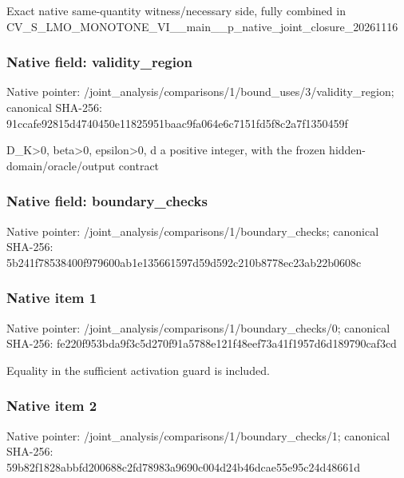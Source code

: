\documentclass[10pt,a4paper]{article}
\begin{document}
\begingroup\raggedright\sloppy Exact native same-quantity witness/\allowbreak{}necessary side,\allowbreak{} fully combined in CV\_\allowbreak{}S\_\allowbreak{}LMO\_\allowbreak{}MONOTONE\_\allowbreak{}VI\_\allowbreak{}\_\allowbreak{}main\_\allowbreak{}\_\allowbreak{}p\_\allowbreak{}native\_\allowbreak{}joint\_\allowbreak{}closure\_\allowbreak{}20261116\par\endgroup

\subsubsection{Native field: validity\_\allowbreak{}region}
Native pointer: /joint\_\allowbreak{}analysis/comparisons/1/bound\_\allowbreak{}uses/3/validity\_\allowbreak{}region; canonical SHA-256: 91ccafe92815d4740450e11825951baac9fa064e6c7151fd5f8c2a7f1350459f

\begingroup\raggedright\sloppy D\_\allowbreak{}K>0,\allowbreak{} beta>0,\allowbreak{} epsilon>0,\allowbreak{} d a positive integer,\allowbreak{} with the frozen hidden-domain/\allowbreak{}oracle/\allowbreak{}output contract\par\endgroup

\subsubsection{Native field: boundary\_\allowbreak{}checks}
Native pointer: /joint\_\allowbreak{}analysis/comparisons/1/boundary\_\allowbreak{}checks; canonical SHA-256: 5b241f78538400f979600ab1e135661597d59d592c210b8778ec23ab22b0608c

\subsubsection{Native item 1}
Native pointer: /joint\_\allowbreak{}analysis/comparisons/1/boundary\_\allowbreak{}checks/0; canonical SHA-256: fe220f953bda9f3c5d270f91a5788e121f48eef73a41f1957d6d189790caf3cd

\begingroup\raggedright\sloppy Equality in the sufficient activation guard is included.\par\endgroup

\subsubsection{Native item 2}
Native pointer: /joint\_\allowbreak{}analysis/comparisons/1/boundary\_\allowbreak{}checks/1; canonical SHA-256: 59b82f1828abbfd200688c2fd78983a9690c004d24b46dcae55e95c24d48661d
\end{document}
